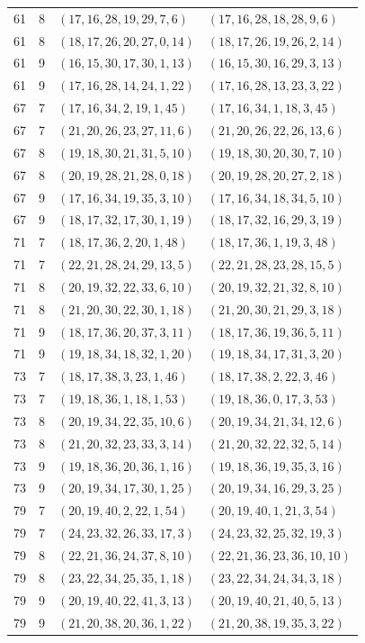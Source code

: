 \begin{longtable}{rrll}
61&8&$(17,16,28,19,29,7,6)$&$(17,16,28,18,28,9,6)$\\
61&8&$(18,17,26,20,27,0,14)$&$(18,17,26,19,26,2,14)$\\
61&9&$(16,15,30,17,30,1,13)$&$(16,15,30,16,29,3,13)$\\
61&9&$(17,16,28,14,24,1,22)$&$(17,16,28,13,23,3,22)$\\
67&7&$(17,16,34,2,19,1,45)$&$(17,16,34,1,18,3,45)$\\
67&7&$(21,20,26,23,27,11,6)$&$(21,20,26,22,26,13,6)$\\
67&8&$(19,18,30,21,31,5,10)$&$(19,18,30,20,30,7,10)$\\
67&8&$(20,19,28,21,28,0,18)$&$(20,19,28,20,27,2,18)$\\
67&9&$(17,16,34,19,35,3,10)$&$(17,16,34,18,34,5,10)$\\
67&9&$(18,17,32,17,30,1,19)$&$(18,17,32,16,29,3,19)$\\
71&7&$(18,17,36,2,20,1,48)$&$(18,17,36,1,19,3,48)$\\
71&7&$(22,21,28,24,29,13,5)$&$(22,21,28,23,28,15,5)$\\
71&8&$(20,19,32,22,33,6,10)$&$(20,19,32,21,32,8,10)$\\
71&8&$(21,20,30,22,30,1,18)$&$(21,20,30,21,29,3,18)$\\
71&9&$(18,17,36,20,37,3,11)$&$(18,17,36,19,36,5,11)$\\
71&9&$(19,18,34,18,32,1,20)$&$(19,18,34,17,31,3,20)$\\
73&7&$(18,17,38,3,23,1,46)$&$(18,17,38,2,22,3,46)$\\
73&7&$(19,18,36,1,18,1,53)$&$(19,18,36,0,17,3,53)$\\
73&8&$(20,19,34,22,35,10,6)$&$(20,19,34,21,34,12,6)$\\
73&8&$(21,20,32,23,33,3,14)$&$(21,20,32,22,32,5,14)$\\
73&9&$(19,18,36,20,36,1,16)$&$(19,18,36,19,35,3,16)$\\
73&9&$(20,19,34,17,30,1,25)$&$(20,19,34,16,29,3,25)$\\
79&7&$(20,19,40,2,22,1,54)$&$(20,19,40,1,21,3,54)$\\
79&7&$(24,23,32,26,33,17,3)$&$(24,23,32,25,32,19,3)$\\
79&8&$(22,21,36,24,37,8,10)$&$(22,21,36,23,36,10,10)$\\
79&8&$(23,22,34,25,35,1,18)$&$(23,22,34,24,34,3,18)$\\
79&9&$(20,19,40,22,41,3,13)$&$(20,19,40,21,40,5,13)$\\
79&9&$(21,20,38,20,36,1,22)$&$(21,20,38,19,35,3,22)$\\
\bottomrule\end{longtable}
\endgroup

